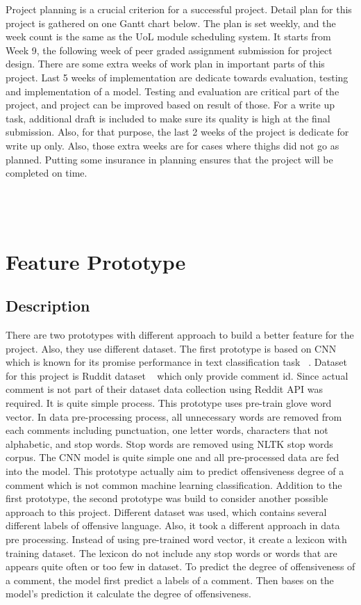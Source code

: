 \documentclass[12pt, natbib=false]{article}
\begin{document}
Project planning is a crucial criterion for a successful project. Detail plan for this project is gathered on one Gantt chart below.
The plan is set weekly, and the week count is the same as the UoL module scheduling system. It starts from Week 9, the following week of peer graded assignment submission for project design.
There are some extra weeks of work plan in important parts of this project. Last 5 weeks of implementation are dedicate towards evaluation, testing and implementation of a model.
Testing and evaluation are critical part of the project, and project can be improved based on result of those.
For a write up task, additional draft is included to make sure its quality is high at the final submission.
Also, for that purpose, the last 2 weeks of the project is dedicate for write up only.
Also, those extra weeks are for cases where thighs did not go as planned.
Putting some insurance in planning ensures that the project will be completed on time. \\
\\
\\
\\

\section{Feature Prototype}
\subsection{Description}
There are two prototypes with different approach to build a better feature for the project.
Also, they use different dataset. The first prototype is based on CNN which is known for its promise performance in text classification task ~\cite{wang2021short}.
Dataset for this project is Ruddit dataset ~\cite{hada2021ruddit} which only provide comment id.
Since actual comment is not part of their dataset data collection using Reddit API was required. It is quite simple process.
This prototype uses pre-train glove word vector. In data pre-processing process, all unnecessary words are removed from each comments including punctuation, one letter words, characters that not alphabetic, and stop words. Stop words are removed using NLTK stop words corpus.
The CNN model is quite simple one and all pre-processed data are fed into the model.
This prototype actually aim to predict offensiveness degree of a comment which is not common machine learning classification.
Addition to the first prototype, the second prototype was build to consider another possible approach to this project.
Different dataset was used, which contains several different labels of offensive language.
Also, it took a different approach in data pre processing.
Instead of using pre-trained word vector, it create a lexicon with training dataset.
The lexicon do not include any stop words or words that are appears quite often or too few in dataset.
To predict the degree of offensiveness of a comment, the model first predict a labels of a comment.
Then bases on the model’s prediction it calculate the degree of offensiveness.
\end{document}
